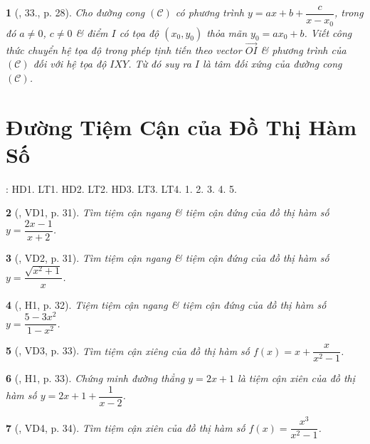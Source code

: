 \documentclass{article}
\newtheorem{baitoan}{}
\begin{document}
\begin{baitoan}[\cite{SGK_Toan_12_giai_tich_nang_cao}, 33., p. 28]
	Cho đường cong $(\mathcal{C})$ có phương trình $y = ax + b + \dfrac{c}{x - x_0}$, trong đó $a\ne0$, $c\ne0$ \& điểm $I$ có tọa độ $(x_0,y_0)$ thỏa mãn $y_0 = ax_0 + b$. Viết công thức chuyển hệ tọa độ trong phép tịnh tiến theo vector $\vec{OI}$ \& phương trình của $(\mathcal{C})$ đối với hệ tọa độ $IXY$. Từ đó suy ra $I$ là tâm đối xứng của đường cong $(\mathcal{C})$.
\end{baitoan}


\section{Đường Tiệm Cận của Đồ Thị Hàm Số}
\cite[Chap. I, \S3, pp. 21--27]{SGK_Toan_12_Canh_Dieu_tap_1}: HD1. LT1. HD2. LT2. HD3. LT3. LT4. 1. 2. 3. 4. 5.

\begin{baitoan}[\cite{SGK_Toan_12_giai_tich_nang_cao}, VD1, p. 31]
	Tìm tiệm cận ngang \& tiệm cận đứng của đồ thị hàm số $y = \dfrac{2x - 1}{x + 2}$.
\end{baitoan}

\begin{baitoan}[\cite{SGK_Toan_12_giai_tich_nang_cao}, VD2, p. 31]
	Tìm tiệm cận ngang \& tiệm cận đứng của đồ thị hàm số $y = \dfrac{\sqrt{x^2 + 1}}{x}$.
\end{baitoan}

\begin{baitoan}[\cite{SGK_Toan_12_giai_tich_nang_cao}, H1, p. 32]
	Tiệm tiệm cận ngang \& tiệm cận đứng của đồ thị hàm số $y = \dfrac{5 - 3x^2}{1 - x^2}$.
\end{baitoan}

\begin{baitoan}[\cite{SGK_Toan_12_giai_tich_nang_cao}, VD3, p. 33]
	Tìm tiệm cận xiêng của đồ thị hàm số $f(x) = x + \dfrac{x}{x^2 - 1}$.
\end{baitoan}

\begin{baitoan}[\cite{SGK_Toan_12_giai_tich_nang_cao}, H1, p. 33]
	Chứng minh đường thẳng $y = 2x + 1$ là tiệm cận xiên của đồ thị hàm số $y = 2x + 1 + \dfrac{1}{x - 2}$.
\end{baitoan}

\begin{baitoan}[\cite{SGK_Toan_12_giai_tich_nang_cao}, VD4, p. 34]
	Tìm tiệm cận xiên của đồ thị hàm số $f(x) = \dfrac{x^3}{x^2 - 1}$.
\end{baitoan}
\end{document}
